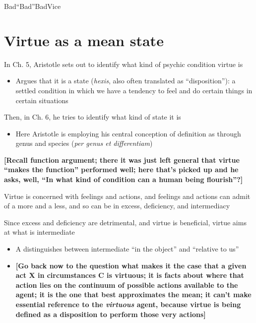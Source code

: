 \documentclass[11pt]{article}
\begin{document}
\noindent Bad\hspace*{23mm}``Bad''\hspace*{35mm}Bad\hspace*{29mm}Vice

\section*{Virtue as a mean state}

\noindent In Ch. 5, Aristotle sets out to identify what kind of psychic condition virtue is

\begin{itemize}\item{Argues that it is a state (\emph{hexis}, also often translated as ``disposition''): a settled condition in which we have a tendency to feel and do certain things in certain situations}\end{itemize}

\noindent Then, in Ch. 6, he tries to identify what kind of state it is

\begin{itemize}\item{Here Aristotle is employing his central conception of definition as through genus and species (\emph{per genus et differentiam})}\end{itemize}
\vspace*{2mm}

\noindent\textbf{[Recall function argument; there it was just left general that virtue ``makes the function'' performed well; here that's picked up and he asks, well, ``In what kind of condition can a human being flourish''?]}
\vspace*{2mm} 

\noindent Virtue is concerned with feelings and actions, and feelings and actions can admit of a more and a less, and so can be in excess, deficiency, and intermediacy
\vspace*{2mm}

\noindent Since excess and deficiency are detrimental, and virtue is beneficial, virtue aims at what is intermediate

\begin{itemize}\item{A distinguishes between intermediate ``in the object'' and ``relative to us''}\item{\textbf{[Go back now to the question what makes it the case that a given act X in circumstances C is virtuous; it is facts about where that action lies on the continuum of possible actions available to the agent; it is the one that best approximates the mean; it can't make essential reference to the \emph{virtuous} agent, because virtue is being defined as a disposition to perform those very actions]}}\end{itemize}
\end{document}
